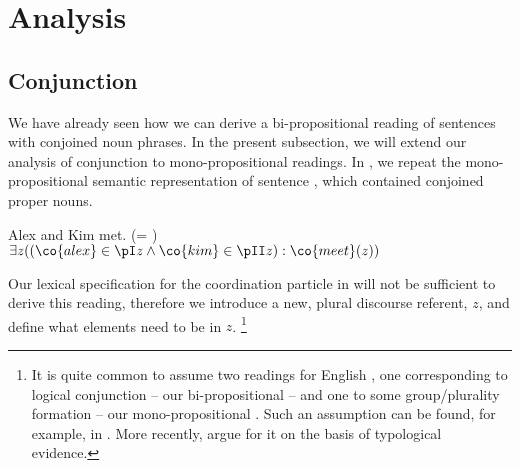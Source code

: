 \documentclass[output=paper]{langsci/langscibook}
\begin{document}


\section{Analysis}
\label{Sec-Analysis}



\subsection{Conjunction}
\label{Sec-AnalyisConjunction}

We have already seen how we can derive a bi-propositional reading of sentences with conjoined noun phrases. In the present subsection, we will extend our analysis of conjunction to mono-propositional readings.
In , we repeat the mono-propositional semantic representation of sentence , which contained conjoined proper nouns.

\vbox{
\ea \label{KimAlexTalk-lf2}
Alex and Kim met. \hfill(= )
\glt $\exists z 
((\co{alex} \in \pI z
\land \co{kim} \in \pII z)
: \co{meet}(z))$
\z
}

Our lexical specification for the coordination particle in  will not be sufficient to derive this reading, therefore we introduce a new, plural discourse referent, $z$, and define what elements need to be in $z$.%
\footnote{It is quite common to assume two readings for English , one corresponding to logical conjunction -- our bi-propositional  -- and one to some group/plurality formation -- our mono-propositional . Such an assumption can be found, for example, in \citet{Partee:Rooth:83}. More recently, \citet{Mitrovic:Sauerland:16} argue for it on the basis of typological evidence.
}

\end{document}
